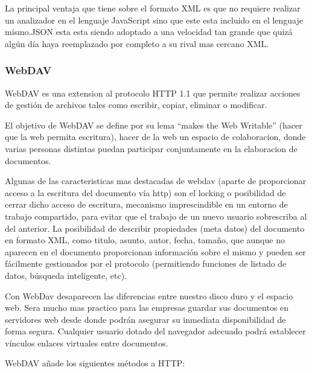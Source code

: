 La principal ventaja que tiene sobre el formato XML es que no requiere realizar un analizador en el lenguaje JavaScript sino que este esta incluido en el lenguaje mismo.\newline JSON esta esta siendo adoptado a una velocidad tan grande que quizá algún día haya reemplazado por completo a su rival mas cercano XML.


\subsubsection*{WebDAV}
\label{tec:webdav}

WebDAV es una extension al protocolo HTTP 1.1 que permite realizar acciones de gestión de archivos tales como escribir, copiar, eliminar o modificar.

El objetivo de WebDAV se define por su lema ``makes the Web Writable'' (hacer que la web permita escritura), hacer de la web un espacio de colaboracion, donde varias personas distintas puedan participar conjuntamente en la elaboracion de documentos.

Algunas de las caracteristicas mas destacadas de webdav (aparte de proporcionar acceso a la escritura del documento vía http) son el locking o posibilidad de cerrar dicho acceso de escritura, mecanismo imprescindible en un entorno de trabajo compartido, para evitar que el trabajo de un nuevo usuario sobrescriba al del anterior. La posibilidad de describir propiedades (meta datos) del documento en formato XML, como titulo, asunto, autor, fecha, tamaño, que aunque no aparecen en el documento proporcionan información sobre el mismo y pueden ser fácilmente gestionados por el protocolo (permitiendo funciones de listado de datos, búsqueda inteligente, etc).

Con WebDav desaparecen las diferencias entre nuestro disco duro y el espacio web. Sera mucho mas practico para las empresas guardar sus documentos en servidores web desde donde podrán asegurar su inmediata disponibilidad de forma segura. Cualquier usuario dotado del navegador adecuado podrá establecer vínculos enlaces virtuales entre documentos.

WebDAV añade los siguientes métodos a HTTP:

